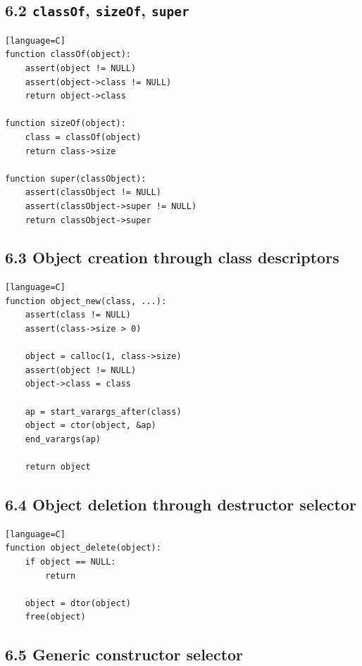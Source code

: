 \documentclass[11pt]{article}
\begin{document}
\subsection{\texorpdfstring{6.2 \texttt{classOf}, \texttt{sizeOf},
\texttt{super}}{6.2 classOf, sizeOf, super}}\label{classof-sizeof-super}

\begin{verbatim}[language=C]
function classOf(object):
    assert(object != NULL)
    assert(object->class != NULL)
    return object->class

function sizeOf(object):
    class = classOf(object)
    return class->size

function super(classObject):
    assert(classObject != NULL)
    assert(classObject->super != NULL)
    return classObject->super
\end{verbatim}

\subsection{6.3 Object creation through class
descriptors}\label{object-creation-through-class-descriptors}

\begin{verbatim}[language=C]
function object_new(class, ...):
    assert(class != NULL)
    assert(class->size > 0)

    object = calloc(1, class->size)
    assert(object != NULL)
    object->class = class

    ap = start_varargs_after(class)
    object = ctor(object, &ap)
    end_varargs(ap)

    return object
\end{verbatim}

\subsection{6.4 Object deletion through destructor
selector}\label{object-deletion-through-destructor-selector}

\begin{verbatim}[language=C]
function object_delete(object):
    if object == NULL:
        return

    object = dtor(object)
    free(object)
\end{verbatim}

\subsection{6.5 Generic constructor
selector}\label{generic-constructor-selector}
\end{document}
